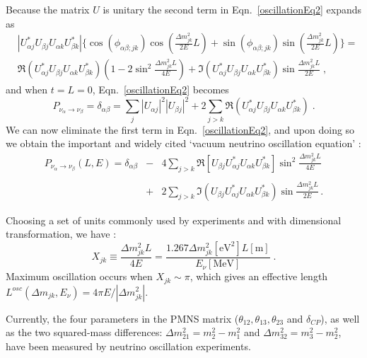 Because the matrix $U$ is unitary the second term in Eqn.~\ref{oscillationEq2} expands as
\begin{equation}
 \begin{split}
&|U^*_{\alpha j}U_{\beta j}U_{\alpha k}U^*_{\beta k}|\{\cos(\phi_{\alpha\beta;jk})\cos(\frac{\Delta m^2_{jk}}{2E}L)+\sin(\phi_{\alpha\beta;jk})\sin(\frac{\Delta m^2_{jk}}{2E}L)\}=\\
&\Re(U^*_{\alpha j}U_{\beta j}U_{\alpha k}U^*_{\beta k})(1-2\sin^2\frac{\Delta m^2_{jk}L}{4E})+\Im(U^*_{\alpha j}U_{\beta j}U_{\alpha k}U^*_{\beta k})\sin\frac{\Delta m^2_{jk}L}{2E} \;,
 \end{split}
\end{equation}
and when $t=L=0$, Eqn.~\ref{oscillationEq2} becomes
\begin{equation}
P_{\nu_\alpha\to\nu_\beta}=\delta_{\alpha\beta}=\sum_j |U_{\alpha j}|^2|U_{\beta j}|^2+2\sum_{j>k}\Re(U^*_{\alpha j}U_{\beta j}U_{\alpha k}U^*_{\beta k}) \; .
\end{equation} 
We can now eliminate the first term in Eqn.~\ref{oscillationEq2}, and upon doing so we obtain the important and widely cited `vacuum neutrino oscillation equation' \cite{pdg2020,aitchison2012gauge}:
\begin{eqnarray}\label{common_oscillation}
P_{\nu_\alpha\to\nu_\beta}(L,E) = \delta_{\alpha\beta} &-& 4\sum_{j>k} \Re[U_{\beta j}U^*_{\alpha j}U_{\alpha k}U^*_{\beta k}]\sin^2\frac{\Delta m^2_{jk}L}{4E} \nonumber\\
&\;& \\
&+& 2\sum_{j>k} \Im(U_{\beta j}U^*_{\alpha j}U_{\alpha k}U^*_{\beta k})\sin\frac{\Delta m^2_{jk}L}{2E} \nonumber \, .
\end{eqnarray}

Choosing a set of units commonly used by experiments and with dimensional transformation, we have \cite{pdg2020}:
\begin{equation}\label{oscillationCondition}
X_{jk}\equiv \frac{\Delta m^2_{jk}L}{4E}=\frac{1.267\Delta m_{jk}^2[\mathrm{eV}^2]L[\mathrm{m}]}{E_\nu[\mathrm{MeV}]}\; .
\end{equation}
Maximum oscillation occurs when $X_{jk}\sim \pi$, which gives an effective length $L^{osc}(\Delta m_{jk},E_\nu)=4\pi E/|\Delta m_{jk}^2|$.

Currently, the four parameters in the PMNS matrix ($\theta_{12},\theta_{13},\theta_{23}$ and $\delta_{CP}$), as well as the two squared-mass differences: $\Delta m^2_{21}=m_2^2-m_1^2$ and $\Delta m^2_{32}=m^2_3-m^2_2$, have been measured by neutrino oscillation experiments. 

